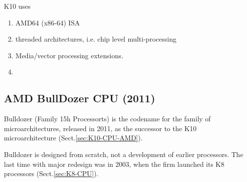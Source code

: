 K10 uses
\begin{enumerate}
  \item AMD64 (x86-64) ISA
  
  \item threaded architectures, i.e. chip level multi-processing
  
  \item Media/vector processing extensions.
  
  \item 
\end{enumerate}

\subsection{AMD BullDozer CPU (2011)}
\label{sec:Bulldozer-CPU}

Bulldozer (Family 15h Processorts) is the codename for the family of
microarchitectures, released in 2011, as the successor to the K10
microarchitecture (Sect.\ref{sec:K10-CPU-AMD}).

Bulldozer is designed from scratch, not a development of earlier processors. The
last time with major redesign was in 2003, when the firm launched its K8
processors (Sect.\ref{sec:K8-CPU}).

